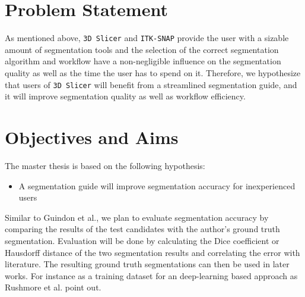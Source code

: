 \section{Problem Statement}
\begin{body}
	As mentioned above, \texttt{3D Slicer} and \texttt{ITK-SNAP} provide the user with a sizable amount of segmentation tools and the selection of the correct segmentation algorithm and workflow have a non-negligible influence on the segmentation quality as well as the time the user has to spend on it.
	Therefore, we hypothesize that users of \texttt{3D Slicer} will benefit from a streamlined segmentation guide, and it will improve segmentation quality as well as workflow efficiency.
\end{body}
\clearpage
\section{Objectives and Aims}
\begin{body}
  The master thesis is based on the following hypothesis:
  \begin{itemize}
	\item A segmentation guide will improve segmentation accuracy for inexperienced users
  \end{itemize}
  Similar to Guindon et al.\cite{diceMeasuresAmountEcologic1945}, we plan to evaluate segmentation accuracy by comparing the results of the test candidates with the author's ground truth segmentation. Evaluation will be done by calculating the Dice coefficient\cite{diceMeasuresAmountEcologic1945} or Hausdorff distance\cite{birsanOneHundredYears2006} of the two segmentation results and correlating the error with literature\cite{kenneyHighthroughputSemiautomatedBone2022}. The resulting ground truth segmentations can then be used in later works. For instance as a training dataset for an deep-learning based approach as Rushmore et al. point out\cite{rushmoreAnatomicallyCuratedSegmentation2022}.
\end{body}
\clearpage

